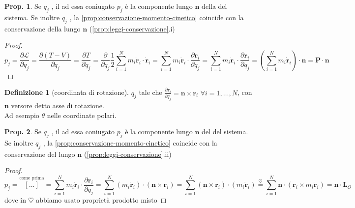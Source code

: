 \documentclass[a4paper,10pt]{article}
\theoremstyle{definition}
\newcommand{\bv}{\boldsymbol} %
\theoremstyle{indentdefinition}
\newtheorem{defn}{Definizione}[section]
\theoremstyle{indenttheorem}
\newtheorem{prop}{Prop.}
\theoremstyle{myremark}
\theoremstyle{indentgeneral}
\begin{document}
\begin{prop}
Se $q_{j}$ , il 
ad essa coniugato $p_{j}$ è la componente lungo $\boldsymbol{n}$
della  del sistema. Se inoltre $q_{j}$
, la \ref{prop:conservazione-momento-cinetico}
coincide con la conservazione della 
lungo $\boldsymbol{n}$ (\ref{prop:leggi-conservazione}.i)
\end{prop}

\begin{proof}
\[
p_{j}=\frac{\partial\mathcal{L}}{\partial\dot{q}_{j}}=\frac{\partial(T-V)}{\partial\dot{q}_{j}}=\frac{\partial T}{\partial\dot{q}_{j}}=\frac{\partial }{\partial\dot{q}_{j}} \frac{1}{2}\sum_{i=1}^Nm_i\dot{\bv{r}}_i\cdot\dot{\bv{r}}_i=\sum_{i=1}^{N}m_{i}\dot{\boldsymbol{r}}_{i}\cdot\frac{\partial\dot{\boldsymbol{r}}_{i}}{\partial\dot{q}_{j}}=\sum_{i=1}^{N}m_{i}\dot{\boldsymbol{r}}_{i}\cdot\frac{\partial\boldsymbol{r}_{i}}{\partial q_{j}}=\left(\sum_{i=1}^{N}m_{i}\dot{\boldsymbol{r}}_{i}\right)\cdot\boldsymbol{n}=\boldsymbol{P}\cdot\boldsymbol{n}
\]
\end{proof}

\begin{defn}[coordinata di rotazione]
\label{def:coordinata-rotazione}$q_{j}$ tale che $\frac{\partial\boldsymbol{r}_{i}}{\partial q_{j}}=\boldsymbol{n}\times\boldsymbol{r}_{i}$
$\forall i=1,\dots,N$, con $\boldsymbol{n}$ versore detto asse di
rotazione. \\
Ad esempio $\theta$ nelle coordinate polari.
\end{defn}

\begin{prop}
Se $q_{j}$ , il 
ad essa coniugato $p_{j}$ è la componente lungo $\boldsymbol{n}$
del  del sistema. Se inoltre $q_{j}$
, la \ref{prop:conservazione-momento-cinetico}
coincide con la conservazione del 
lungo $\boldsymbol{n}$ (\ref{prop:leggi-conservazione}.ii)
\end{prop}

\begin{proof}
\[
p_{j}=\overset{\text{come prima}}{[\dots]}=\sum_{i=1}^{N}m_{i}\dot{\boldsymbol{r}}_{i}\cdot\frac{\partial{\boldsymbol{r}}_{i}}{\partial{q}_{j}}=\sum_{i=1}^{N}\left(m_{i}\dot{\boldsymbol{r}}_{i}\right)\cdot\left(\boldsymbol{n}\times\boldsymbol{r}_{i}\right)=\sum_{i=1}^{N}\left(\boldsymbol{n}\times\boldsymbol{r}_{i}\right)\cdot \left(m_{i}\dot{\boldsymbol{r}}_{i}\right)
\overset{\heartsuit}{=}\sum_{i=1}^{N}\boldsymbol{n}\cdot\left(\boldsymbol{r}_{i}\times m_{i}\dot{\boldsymbol{r}}_{i}\right)=\boldsymbol{n}\cdot\boldsymbol{L}_{O}
\]
dove in $\heartsuit$ abbiamo usato proprietà prodotto misto
\end{proof}
\end{document}
